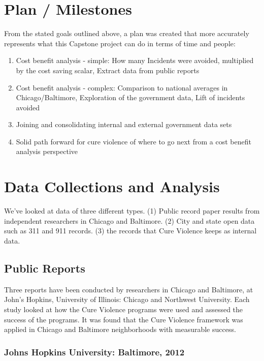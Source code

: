 \documentclass[11pt,preprint]{aastex}
\begin{document}
\section{Plan / Milestones}
From the stated goals outlined above, a plan was created that more accurately represents what this Capstone project can do in terms of time and people:

\begin{enumerate}
\item Cost benefit analysis - simple:
How many Incidents were avoided, multiplied by the cost saving scalar,
Extract data from public reports
\item Cost benefit analysis - complex:
Comparison to national averages in Chicago/Baltimore,
Exploration of the government data,
Lift of incidents avoided
\item Joining and consolidating internal and external government data sets
\item Solid path forward for cure violence of where to go next from a cost benefit analysis perspective
\end{enumerate}


\section{Data Collections and Analysis}

We've looked at data of three different types. (1) Public record paper results from independent researchers in Chicago and Baltimore. (2) City and state open data such as 311 and 911 records. (3) the records that Cure Violence keeps as internal data.


\subsection*{Public Reports}
Three reports have been conducted by researchers in Chicago and Baltimore, at John's Hopkins,  University of Illinois: Chicago and Northwest University. Each study looked at how the Cure Violence programs were used and assessed the success of the programs. It was found that the Cure Violence framework was applied in Chicago and Baltimore neighborhoods with measurable success.   



\subsubsection*{Johns Hopkins University: Baltimore, 2012}
\end{document}
